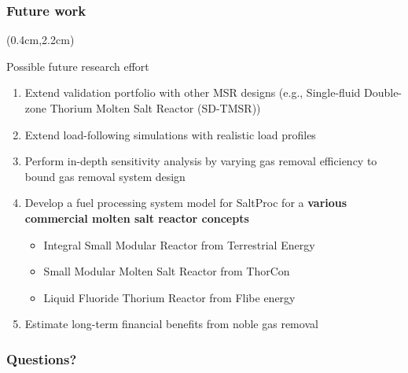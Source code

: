 \begin{frame}
\frametitle{Future work}
\begin{textblock*}{12cm}(0.4cm,2.2cm) %
	\begin{block}{Possible future research effort}
		\begin{enumerate}
			\itemsep1em
			\item Extend validation portfolio with other MSR designs (e.g., 
			Single-fluid 
			Double-zone Thorium Molten Salt Reactor (SD-TMSR))
			\item Extend load-following simulations with realistic load 
			profiles
			\item Perform in-depth sensitivity analysis by varying gas removal 
			efficiency to bound gas removal system design
			\item Develop a fuel processing system model for SaltProc
			for a \textbf{various commercial molten salt reactor concepts}
			\begin{itemize}
				\itemsep0.5em
				\item Integral Small Modular Reactor from Terrestrial Energy
				\item Small Modular Molten Salt Reactor from ThorCon
				\item Liquid Fluoride Thorium Reactor from Flibe
energy 
			\end{itemize}
			\item Estimate long-term financial benefits from noble gas removal
		\end{enumerate}
	\end{block}
\end{textblock*}
\end{frame}



\begin{frame}
	\frametitle{Questions?}
\end{frame}